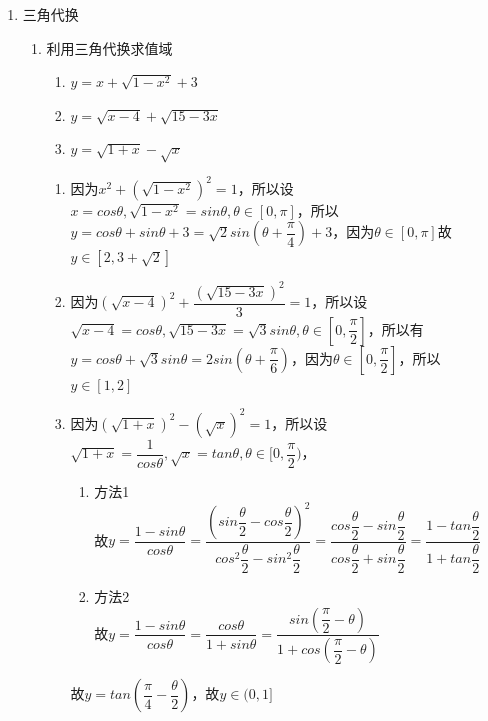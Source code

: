 \begin{enumerate}
\item 三角代换
\begin{enumerate}
    \item 利用三角代换求值域
    \begin{enumerate}
        \item $y = x + \sqrt{1-x^2}+3$
        \item $y = \sqrt{x - 4} + \sqrt{15-3x}$
        \item $y = \sqrt{1+x} - \sqrt{x}$
    \end{enumerate}
    \begin{jieda}
        \begin{enumerate}
            \item 因为$x^2 + (\sqrt{1-x^2})^2 = 1$，所以设$x = cos\theta, \sqrt{1-x^2} = sin\theta, \theta \in [0, \pi]$，所以$y = cos\theta + sin\theta + 3 = \sqrt{2}sin(\theta + \dfrac{\pi}{4}) + 3$，因为$\theta \in [0, \pi]$故$y \in [2, 3+\sqrt{2}]$
            \item 因为$(\sqrt{x-4})^2 + \dfrac{(\sqrt{15-3x})^2}{3} = 1$，所以设$\sqrt{x-4} = cos\theta, \sqrt{15-3x} = \sqrt{3}sin\theta, \theta \in [0, \dfrac{\pi}{2}]$，所以有$y = cos\theta + \sqrt{3}sin\theta = 2sin(\theta + \dfrac{\pi}{6})$，因为$\theta \in [0, \dfrac{\pi}{2}]$，所以$y \in [1, 2]$
            \item 因为$(\sqrt{1+x})^2 - (\sqrt{x})^2 = 1$，所以设$\sqrt{1+x} = \dfrac{1}{cos\theta}, \sqrt{x} = tan\theta, \theta \in [0, \dfrac{\pi}{2})$，
            \begin{enumerate}[1.]
                \item 方法1 \\
                    故$y = \dfrac{1-sin\theta}{cos\theta} = \dfrac{(sin\dfrac{\theta}{2} - cos\dfrac{\theta}{2})^2}{cos^2\dfrac{\theta}{2} - sin^2\dfrac{\theta}{2}} = \dfrac{cos\dfrac{\theta}{2} - sin\dfrac{\theta}{2}}{cos\dfrac{\theta}{2} + sin\dfrac{\theta}{2}} = \dfrac{1 - tan\dfrac{\theta}{2}}{1 + tan\dfrac{\theta}{2}}$
                \item 方法2 \\
                    故$y = \dfrac{1-sin\theta}{cos\theta} = \dfrac{cos\theta}{1+sin\theta} = \dfrac{sin(\dfrac{\pi}{2} - \theta)}{1 + cos(\dfrac{\pi}{2} - \theta)}$
            \end{enumerate}
            故$y = tan(\dfrac{\pi}{4} - \dfrac{\theta}{2})$，故$y \in (0, 1]$
            

\end{enumerate}
\end{jieda}
\end{enumerate}
\end{enumerate}
